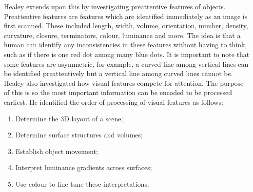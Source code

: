 			Healey extends upon this by investigating preattentive features of objects\cite{attention_visualizaton_healey}. Preattentive features are features which are identified immediately as an image is first scanned. These included length, width, volume, orientation, number, density, curvature, closure, terminators, colour, luminance and more. The idea is that a human can identify any inconsistencies in these features without having to think, such as if there is one red dot among many blue dots. It is important to note that some features are asymmetric, for example, a curved line among vertical lines can be identified preattentively but a vertical line among curved lines cannot be. Healey also investigated how visual features compete for attention. The purpose of this is so the most important information can be encoded to be processed earliest. He identified the order of processing of visual features as follows:
			
			\begin{enumerate}
				\item Determine the 3D layout of a scene;
				\item Determine surface structures and volumes;
				\item Establish object movement;
				\item Interpret luminance gradients across surfaces;
				\item Use colour to fine tune these interpretations.
			\end{enumerate}
		
